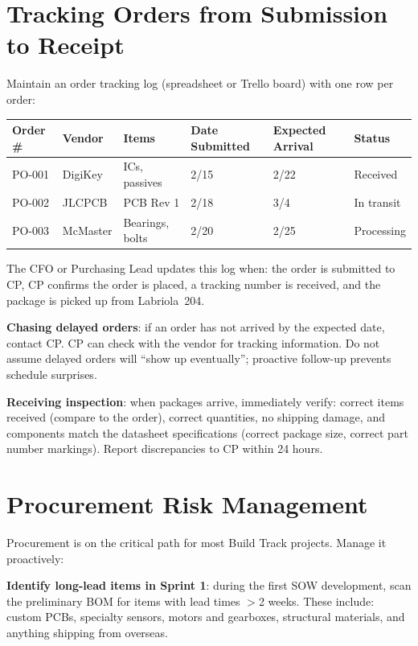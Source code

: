 \section{Tracking Orders from Submission to Receipt}
Maintain an order tracking log (spreadsheet or Trello board) with one row per order:

\begin{center}\small
\begin{tabularx}{\textwidth}{lXXXXX}
\toprule
\textbf{Order \#} & \textbf{Vendor} & \textbf{Items} & \textbf{Date Submitted} & \textbf{Expected Arrival} & \textbf{Status} \\
\midrule
PO-001 & DigiKey & ICs, passives & 2/15 & 2/22 & Received \\
PO-002 & JLCPCB & PCB Rev 1 & 2/18 & 3/4 & In transit \\
PO-003 & McMaster & Bearings, bolts & 2/20 & 2/25 & Processing \\
\bottomrule
\end{tabularx}
\end{center}

The CFO or Purchasing Lead updates this log when: the order is submitted to CP, CP confirms the order is placed, a tracking number is received, and the package is picked up from Labriola~204.

\textbf{Chasing delayed orders}: if an order has not arrived by the expected date, contact CP. CP can check with the vendor for tracking information. Do not assume delayed orders will ``show up eventually''; proactive follow-up prevents schedule surprises.

\textbf{Receiving inspection}: when packages arrive, immediately verify: correct items received (compare to the order), correct quantities, no shipping damage, and components match the datasheet specifications (correct package size, correct part number markings). Report discrepancies to CP within 24 hours.



\section{Procurement Risk Management}
Procurement is on the critical path for most Build Track projects. Manage it proactively:

\textbf{Identify long-lead items in Sprint 1}: during the first SOW development, scan the preliminary BOM for items with lead times $>$2 weeks. These include: custom PCBs, specialty sensors, motors and gearboxes, structural materials, and anything shipping from overseas.


